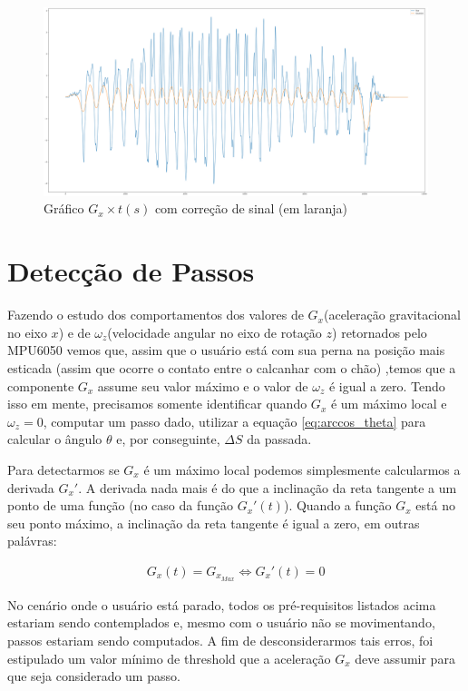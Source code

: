 \documentclass{article}
\begin{document}
            \begin{figure}[h!]
                \centering
                \includegraphics[width=.8\textwidth]{img/Smoothed_data.png}
                \caption{Gráfico $G_x \times t(s)$ com correção de sinal (em laranja)}
                \label{img:smoothed_plot} 
            \end{figure}

        \section{Detecção de Passos}
        Fazendo o estudo dos comportamentos dos valores de $G_x$(aceleração gravitacional no eixo $x$) e de
        $\omega_z$(velocidade angular no eixo de rotação $z$) retornados pelo MPU6050 vemos que, assim
        que o usuário está com sua perna na posição mais esticada (assim que ocorre o contato entre o
        calcanhar com o chão) ,temos que a componente $G_x$  assume seu valor máximo e o valor de $\omega_z$ é
        igual a zero. Tendo isso em mente, precisamos somente identificar quando $G_x$ é um máximo local e
        $\omega_z=0$, computar um passo dado, utilizar a equação \ref{eq:arccos_theta} para calcular o ângulo 
        $\theta$ e, por conseguinte, $\Delta S$ da passada.

        Para detectarmos se $G_x$ é um máximo local podemos simplesmente calcularmos a derivada $G_x'$. A
        derivada nada mais é do que a inclinação da reta tangente a um ponto de uma função (no caso da função $G_x'(t)$).
        Quando a função $G_x$ está no seu ponto máximo, a inclinação da reta tangente é igual a zero, em
        outras palávras:

        \begin{align}
            G_x(t) = G_{x_{Max}} \iff G_x'(t) = 0
        \end{align}

        No cenário onde o usuário está parado, todos os pré-requisitos listados acima estariam sendo
        contemplados e, mesmo com o usuário não se movimentando, passos estariam sendo computados. A fim de
        desconsiderarmos tais erros, foi estipulado um valor mínimo de threshold que a aceleração $G_x$ deve
        assumir para que seja considerado  um passo.
\end{document}
